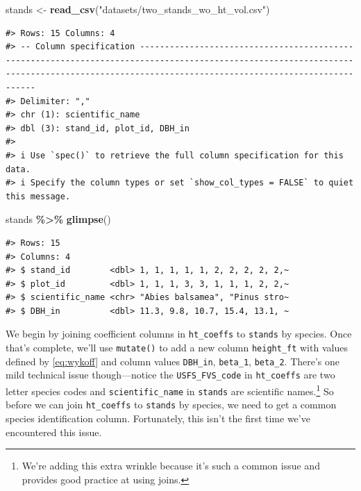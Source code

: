 \documentclass[
  11pt,
]{krantz}
\newenvironment{Shaded}{\begin{snugshade}}{\end{snugshade}}
\newcommand{\KeywordTok}[1]{\textcolor[rgb]{0.13,0.29,0.53}{\textbf{#1}}}
\newcommand{\NormalTok}[1]{#1}
\newcommand{\OperatorTok}[1]{\textcolor[rgb]{0.81,0.36,0.00}{\textbf{#1}}}
\newcommand{\StringTok}[1]{\textcolor[rgb]{0.31,0.60,0.02}{#1}}
\theoremstyle{definition}
\theoremstyle{definition}
\theoremstyle{definition}
\theoremstyle{definition}
\theoremstyle{remark}
\begin{document}
\begin{Shaded}
\begin{Highlighting}[]
\NormalTok{stands \textless{}{-}}\StringTok{ }\KeywordTok{read\_csv}\NormalTok{(}\StringTok{"datasets/two\_stands\_wo\_ht\_vol.csv"}\NormalTok{)}
\end{Highlighting}
\end{Shaded}

\begin{verbatim}
#> Rows: 15 Columns: 4
#> -- Column specification ---------------------------------------------------------------------------------------------------------------------------------------------------------------------------------------------
#> Delimiter: ","
#> chr (1): scientific_name
#> dbl (3): stand_id, plot_id, DBH_in
#> 
#> i Use `spec()` to retrieve the full column specification for this data.
#> i Specify the column types or set `show_col_types = FALSE` to quiet this message.
\end{verbatim}

\begin{Shaded}
\begin{Highlighting}[]
\NormalTok{stands }\OperatorTok{\%\textgreater{}\%}\StringTok{ }\KeywordTok{glimpse}\NormalTok{()}
\end{Highlighting}
\end{Shaded}

\begin{verbatim}
#> Rows: 15
#> Columns: 4
#> $ stand_id        <dbl> 1, 1, 1, 1, 1, 2, 2, 2, 2, 2,~
#> $ plot_id         <dbl> 1, 1, 1, 3, 3, 1, 1, 1, 2, 2,~
#> $ scientific_name <chr> "Abies balsamea", "Pinus stro~
#> $ DBH_in          <dbl> 11.3, 9.8, 10.7, 15.4, 13.1, ~
\end{verbatim}

We begin by joining coefficient columns in \texttt{ht\_coeffs} to \texttt{stands} by species. Once that's complete, we'll use \texttt{mutate()} to add a new column \texttt{height\_ft} with values defined by \eqref{eq:wykoff} and column values \texttt{DBH\_in}, \texttt{beta\_1}, \texttt{beta\_2}. There's one mild technical issue though---notice the \texttt{USFS\_FVS\_code} in \texttt{ht\_coeffs} are two letter species codes and \texttt{scientific\_name} in \texttt{stands} are scientific names.\footnote{We're adding this extra wrinkle because it's such a common issue and provides good practice at using joins.} So before we can join \texttt{ht\_coeffs} to \texttt{stands} by species, we need to get a common species identification column. Fortunately, this isn't the first time we've encountered this issue.
\end{document}
